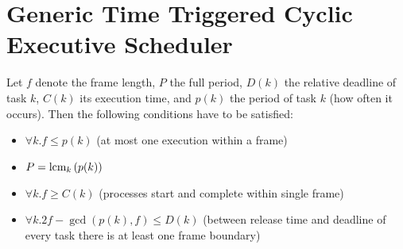 \section{Generic Time Triggered Cyclic Executive Scheduler}
Let $f$ denote the frame length, $P$ the full period, $D(k)$ the relative deadline of task $k$,
$C(k)$ its execution time, and $p(k)$ the period of task $k$ (how often it occurs).
Then the following conditions have to be satisfied:
\begin{itemize}
	\item $\forall k . f \leq p(k)$ (at most one execution within a frame)
	\item $P = \operatorname{lcm}_k\left(p(k)\right)$
	\item $\forall k . f \geq C(k)$ (processes start and complete within single frame)
	\item $\forall k . 2f - \gcd\left(p(k),f\right) \leq D(k)$ (between release time and deadline of every task there is at least one frame boundary)
\end{itemize}
